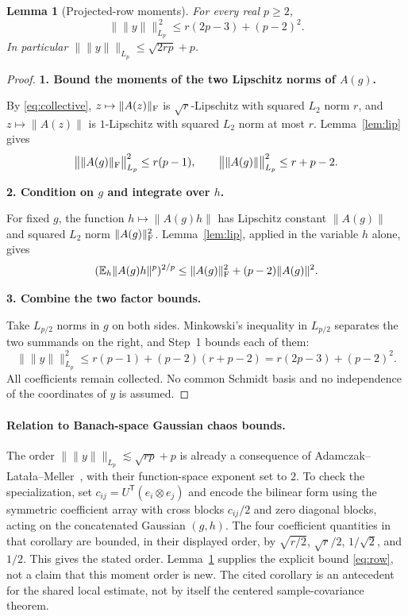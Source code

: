 \documentclass[11pt]{article}
\numberwithin{equation}{section}
\newtheorem{lemma}[theorem]{Lemma}
\theoremstyle{definition}\newtheorem{definition}[theorem]{Definition}
\theoremstyle{remark}\newtheorem{remark}[theorem]{Remark}
\newcommand{\norm}[1]{\lVert#1\rVert}\newcommand{\ip}[2]{\langle#1,#2\rangle}
\newcommand{\step}[1]{\par\addvspace{.65\baselineskip}\Needspace{4\baselineskip}\noindent\textbf{#1}\par\nobreak\smallskip}
\begin{document}
\begin{lemma}[Projected-row moments]\label{lem:row}
For every real $p\ge2$,
\begin{equation}\label{eq:row}
 \boxed{\bigl\|\norm y\bigr\|_{L_p}^{\,2}
 \le r(2p-3)+(p-2)^2.}
\end{equation}
In particular $\|\norm y\|_{L_p}\le\sqrt{2rp}+p$.
\end{lemma}
\begin{proof}
\step{1. Bound the moments of the two Lipschitz norms of $A(g)$.}
By \eqref{eq:collective}, $z\mapsto\norm{A(z)}_\F$ is $\sqrt r$-Lipschitz with
squared $L_2$ norm $r$, and $z\mapsto\norm{A(z)}$ is $1$-Lipschitz with squared
$L_2$ norm at most $r$. Lemma~\ref{lem:lip} gives
\[
 \bigl\|\norm{A(g)}_\F\bigr\|_{L_p}^2\le r(p-1),\qquad
 \bigl\|\norm{A(g)}\bigr\|_{L_p}^2\le r+p-2.
\]

\step{2. Condition on $g$ and integrate over $h$.}
For fixed $g$, the function $h\mapsto\norm{A(g)h}$ has Lipschitz constant
$\norm{A(g)}$ and squared $L_2$ norm $\norm{A(g)}_\F^2$. Lemma~\ref{lem:lip},
applied in the variable $h$ alone, gives
\[
 (\E_h\norm{A(g)h}^p)^{2/p}
 \le\norm{A(g)}_\F^2+(p-2)\norm{A(g)}^2.
\]

\step{3. Combine the two factor bounds.}
Take $L_{p/2}$ norms in $g$ on both sides. Minkowski's inequality in $L_{p/2}$
separates the two summands on the right, and Step~1 bounds each of them:
\[
 \bigl\|\norm y\bigr\|_{L_p}^2
 \le r(p-1)+(p-2)(r+p-2)
 =r(2p-3)+(p-2)^2.
\]
All coefficients remain collected. No common Schmidt basis and no independence of
the coordinates of $y$ is assumed.
\end{proof}

\paragraph{Relation to Banach-space Gaussian chaos bounds.}
The order $\|\norm y\|_{L_p}\lesssim\sqrt{rp}+p$ is already a consequence of
Adamczak--Lata\l a--Meller~\cite[Corollary~12]{ALM}, with their function-space
exponent set to $2$. To check the specialization, set
$c_{ij}=U^{\mathsf T}(e_i\otimes e_j)$ and encode the bilinear form using the
symmetric coefficient array with cross blocks $c_{ij}/2$ and zero diagonal
blocks, acting on the concatenated Gaussian $(g,h)$. The four coefficient
quantities in that corollary are bounded, in their displayed order, by
$\sqrt{r/2}$, $\sqrt r/2$, $1/\sqrt2$, and $1/2$.
This gives the stated order. Lemma~\ref{lem:row} supplies the explicit bound
\eqref{eq:row}, not a claim that this moment order is new. The cited corollary
is an antecedent for the shared local estimate, not by itself the centered
sample-covariance theorem.
\end{document}

